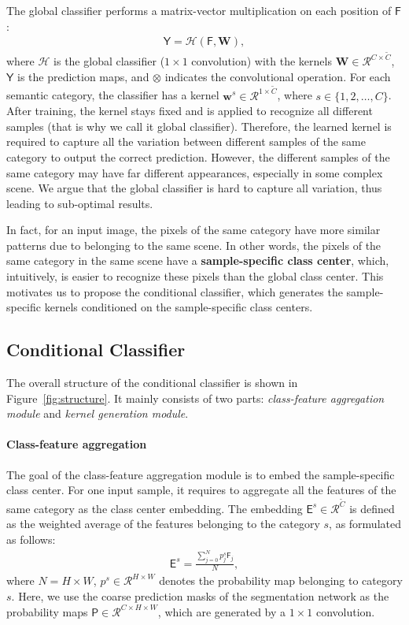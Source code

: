 \documentclass[journal]{IEEEtran}
\newcommand{\ve}[1]{\mathbf{#1}} \newcommand{\ma}[1]{\mathrm{#1}}
\begin{document}
The global classifier performs a matrix-vector
multiplication on each position of $\mathsf{F}$:
\begin{align}
	\mathsf{Y} = \mathcal{H}(\mathsf{F}, \mathbf{W}),
\end{align}
where $\mathcal{H}$ is the global classifier ($1 \times 1$ convolution) with the kernels $\mathbf{W} \in \mathcal{R}^{C \times \tilde{C}}$, $\mathsf{Y}$ is the prediction maps, and $\otimes$ indicates the convolutional operation.
For each semantic category,
the classifier has a kernel $\ve{w}^{s} \in \mathcal{R}^{1 \times \tilde{C}}$, where $s \in \{1, 2, \dots, C\}$.
After training, the kernel stays fixed and 
is applied to recognize all different samples 
(that is why we call it global classifier).
Therefore,
the learned kernel is required to 
capture all the variation between different samples of the same category 
to output the correct prediction.
However, 
the different samples of the same category 
may have far different appearances, 
especially in some complex scene.
We argue that 
the global classifier is hard to 
capture all variation, 
thus leading to sub-optimal results.

In fact, 
for an input image,
the pixels of the same category
have more similar patterns 
due to belonging to the same scene.
In other words,
the pixels of the same category
in the same scene
have a \textbf{sample-specific class center},
which, intuitively, is easier to recognize these pixels 
than the global class center. 
This motivates us 
to propose the conditional classifier,
which generates the sample-specific kernels 
conditioned on the sample-specific class centers.



\subsection{Conditional Classifier}
The overall structure of the conditional classifier
is shown in Figure~\ref{fig:structure}.
It mainly consists of two parts:
\emph{class-feature aggregation module}
and 
\emph{kernel generation module}.

\paragraph{Class-feature aggregation}
The goal of the class-feature aggregation module
is to embed the sample-specific class center.
For one input sample,
it requires to aggregate 
all the features of the same category 
as the class center embedding.
The embedding $\mathsf{E}^s \in \mathcal{R}^{\tilde{C}}$ 
is defined as the weighted average of the features 
belonging to the category $s$, as formulated as follows:
\begin{align}
    \mathsf{E}^s = \frac{\sum_{j=0}^{N}{p}^s_j \mathsf{F}_j}{N},
\end{align}
where $N=H \times W$, $p^s \in \mathcal{R}^{H \times W}$ denotes the probability map belonging to category $s$.
Here, we use the coarse prediction masks of the segmentation network as the probability maps $\mathsf{P} \in \mathcal{R}^{C \times H \times W}$,
which are generated by a $1\times1$ convolution.
\end{document}

